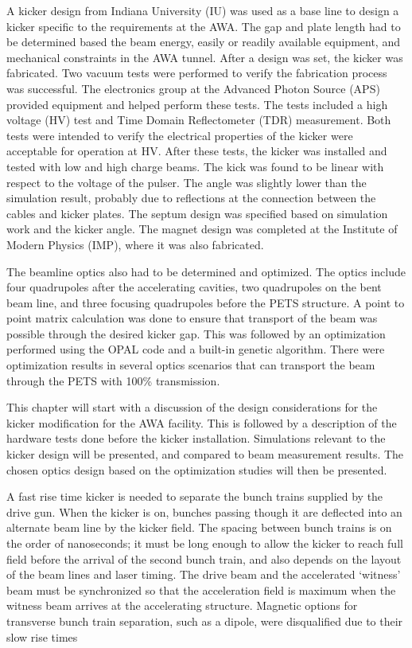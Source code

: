 A kicker design from Indiana University (IU) was used as a base line to design a kicker specific to the
requirements at the AWA. The gap and plate length had to be determined based the beam energy, 
easily or readily available equipment, and mechanical constraints in the AWA tunnel. 
After a design was set, the kicker was fabricated.
Two vacuum tests were performed to verify the fabrication process was successful.
The electronics group at the Advanced Photon Source (APS) provided equipment and helped perform these tests.
The tests included a high voltage (HV) test and Time Domain Reflectometer (TDR) measurement.
Both tests were intended to verify the electrical properties of the kicker were acceptable for operation at HV.
After these tests, the kicker was installed and tested with low and high charge beams. 
The kick was found to be linear with respect to the voltage of the pulser.  
The angle was slightly lower than the simulation result, probably due to reflections at the
connection between the cables and kicker plates. 
The septum design was specified based on simulation work and the kicker angle.
The magnet design was completed at the Institute of Modern Physics (IMP), 
where it was also fabricated. 

The beamline optics also had to be determined and optimized.
The optics include four quadrupoles after the accelerating cavities, 
two quadrupoles on the bent beam line, and three focusing quadrupoles
before the PETS structure.
A point to point matrix calculation was done to ensure that transport of the
beam was possible through the desired kicker gap.  This was followed by an optimization 
performed using the OPAL code and a built-in genetic algorithm. 
There were optimization results in several optics scenarios that can transport 
the beam through the PETS with 100\% transmission.  

This chapter will start with a discussion of the design considerations for the kicker modification for the AWA facility.  
This is followed by a description of the hardware tests done before the kicker installation.  
Simulations relevant to the kicker design will be presented, and compared to beam measurement results.  
The chosen optics design based on the optimization studies will then be presented.


 \label{theory}

A fast rise time kicker is needed to separate the 
bunch trains supplied by the drive gun.  When the kicker is on, 
bunches passing though it are deflected into an alternate beam line by the kicker field.
The spacing between bunch trains is on the order of nanoseconds; 
it must be long enough to allow the kicker to reach full field before the arrival of the second bunch train, 
and also depends on the layout of the beam lines and laser timing.  
The drive beam and the accelerated `witness' beam must be synchronized so that the 
acceleration field is maximum when the witness beam arrives at the accelerating structure.
Magnetic options for transverse bunch train separation, 
such as a dipole, were disqualified due to their slow rise times 

